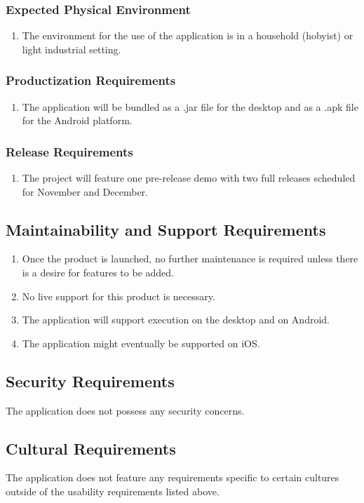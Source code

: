 \documentclass{article}
\begin{document}
\subsubsection{Expected Physical Environment}
\begin{enumerate}
\item The environment for the use of the application is in a household (hobyist) or light industrial setting.
\end{enumerate}
\subsubsection{Productization Requirements}
\begin{enumerate}
\item The application will be bundled as a .jar file for the desktop and as a .apk file for the Android platform.
\end{enumerate}
\subsubsection{Release Requirements}
\begin{enumerate}
\item The project will feature one pre-release demo with two full releases scheduled for November and December.
\end{enumerate}
\subsection{Maintainability and Support Requirements}
\begin{enumerate}
\item Once the product is launched, no further maintenance is required unless there is a desire for features to be added.
\item No live support for this product is necessary.
\item The application will support execution on the desktop and on Android.
\item The application might eventually be supported on iOS.
\end{enumerate}
\subsection{Security Requirements}
The application does not possess any security concerns.
\subsection{Cultural Requirements}
The application does not feature any requirements specific to certain cultures outside of the usability requirements listed above.
\end{document}
